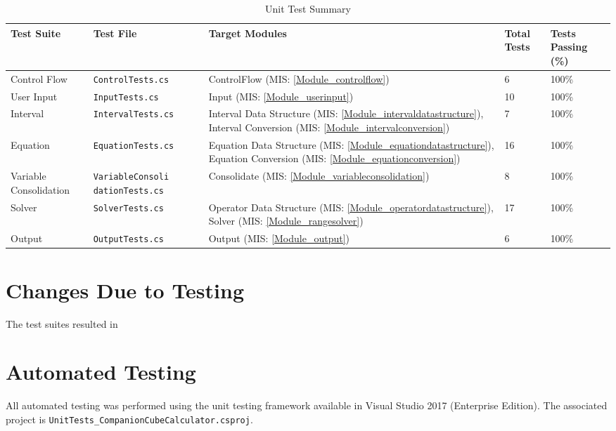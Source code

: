 \documentclass[12pt, titlepage]{article}
\newcommand{\misref}[1]{MIS: \ref{#1}}
\begin{document}
\begin{center}
		\begin{longtable}{ | p{2.5cm} | p{4cm} | p{2.5cm} | m{1cm} | m{1.5cm} 
		|}
		\caption{Unit Test Summary} \\ \hline \label{TblUnitTests} 
		\textbf{Test Suite} & \textbf{Test File} & \textbf{Target Modules} & 
		\textbf{Total Tests} & 
		\textbf{Tests Passing (\%)}  \\ 
		\hline
		Control Flow & \texttt{ControlTests.cs} & ControlFlow 
		(\misref{Module_controlflow}) & 6 & 100\% \\ 
		\hline
		
		User Input & \texttt{InputTests.cs} &Input (\misref{Module_userinput}) 
		& 10 & 100\% \\ \hline
		
		Interval & \texttt{IntervalTests.cs} &Interval Data Structure 
		(\misref{Module_intervaldatastructure}), Interval Conversion 
		(\misref{Module_intervalconversion}) & 7 & 100\% \\ \hline
		
		Equation & \texttt{EquationTests.cs} &Equation Data Structure 
		(\misref{Module_equationdatastructure}), Equation Conversion 
		(\misref{Module_equationconversion}) & 16 & 100\% \\ \hline
		
		Variable Consolidation & \texttt{VariableConsoli dationTests.cs} & 
		Consolidate 
		(\misref{Module_variableconsolidation}) & 8 & 100\% \\ \hline
		
		Solver &\texttt{SolverTests.cs} & Operator Data Structure 
		(\misref{Module_operatordatastructure}), Solver 
		(\misref{Module_rangesolver}) & 17 & 100\% \\ \hline
		
		Output & \texttt{OutputTests.cs} &Output (\misref{Module_output}) & 6 & 
		100\% \\ \hline
	\end{longtable}
\end{center}

\section{Changes Due to Testing}
The test suites resulted in 

\section{Automated Testing}
All automated testing was performed using the unit testing framework available 
in Visual Studio 2017 (Enterprise Edition). The associated project is 
\texttt{UnitTests\_CompanionCubeCalculator.csproj}.
		
\end{document}
